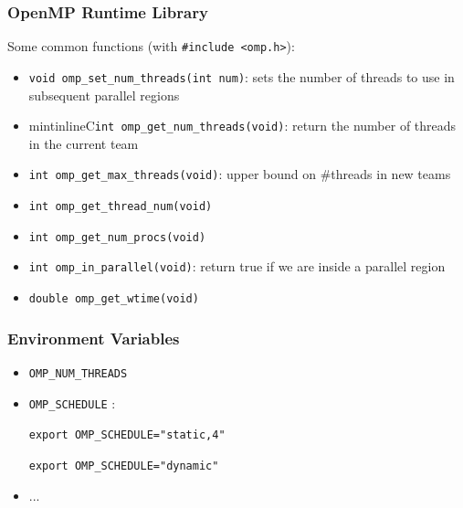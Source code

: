 \documentclass{beamer}
\begin{document}




\begin{frame}[fragile=singleslide]
  \frametitle{OpenMP Runtime Library}

Some common functions (with \texttt{#include <omp.h>}):
\begin{itemize}
  \item \texttt{void omp_set_num_threads(int num\thread)}: sets the number
    of threads to use in subsequent parallel regions
    
  \item mintinline{C}{\tt int omp\_get\_num\_threads(void)}: return the number of threads in the current team
  \item \texttt{int omp_get_max_threads(void)}: upper bound on \#threads in new teams
  \item \texttt{int omp_get_thread_num(void)}
  \item \texttt{int omp_get_num_procs(void)}
  \item \texttt{int omp_in_parallel(void)}: return true if we are inside a parallel region
  \item \texttt{double omp_get_wtime(void)}
\end{itemize}

  
\end{frame}


\begin{frame}
  \frametitle{Environment Variables}
  \begin{itemize}
  \item {\tt OMP\_NUM\_THREADS}
  \item {\tt OMP\_SCHEDULE} :

{\tt export OMP\_SCHEDULE="static,4"}

{\tt export OMP\_SCHEDULE="dynamic"}

    
      
      

  \item ...
    
  \end{itemize}

  
\end{frame}
\end{document}
